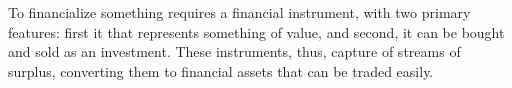 To financialize something requires a \gls{financial instrument}, with two primary features: first it that represents something of value, and second, it can be bought and sold as an investment. These instruments, thus, capture of streams of surplus, converting them to financial assets that can be traded easily. 


